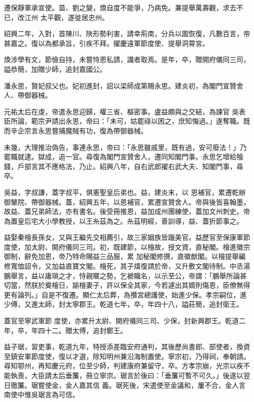 \begin{pinyinscope}
 遷保靜軍承宣使。苗、劉之變，煥自度不能爭，乃病免。兼提舉萬壽觀，求去不已，改江州
 太平觀，遂徙居忠州。



 紹興二年，入對，首陳川、陜形勢利害，請幸荊南，分兵以圖恢復，凡數百言，帝甚嘉之。復以為都承旨，引疾不拜。擢慶遠軍節度使、提舉洞霄宮。



 煥涉學有文，節儉自持，未嘗恃恩私請，識者取焉。是年，卒，贈開府儀同三司，謚恭簡，加贈少師，追封嘉國公。



 潘永思，賢妃叔父也。妃初進封，詔以梁師成第賜永思。建炎初，為閣門宣贊舍人、帶御器械。



 元祐太后在虔，帝遣永思迎歸，權三省、樞密事。盧益頗與之交結，為諫官
 吳表臣所論，範宗尹請出永思，帝曰：「未可，姑罷祿以困之，庶知悔過。」遂奪職。既而辛企宗言永思嘗捕魔賊有功，復為帶御器械。



 未幾，大理推治偽告，事連永思，帝曰：「永思雖戚里，既有過，安可廢法！」乃罷職就逮。獄成，追一官。尋復為閣門宣贊舍人，遷同知閣門事。永思乞增給飱錢，戶部言其不應格法，乃止。紹興八年，自右武郎擢右武大夫、知閣門事，尋卒。



 吳益，字叔謙，蓋字叔平，俱憲聖皇后弟也。益，建炎末，以
 恩補官，累遷乾辦御輦院、帶御器械。蓋，紹興五年，以恩補官，累遷宣贊舍人。帝與後皆喜翰墨，故益、蓋兄弟師法，亦有書名。後受冊推恩，益加成州團練使，蓋加文州刺史。帝為置皇后宅大小學教授，以王糸茲為之。糸茲明經，善訓導，益、蓋折節事之。



 益娶秦檜長孫女，又與王繼先交相薦引，故三家姻族皆躐美官。益歷官至保康軍節度使，加太尉、開府儀同三司。初，既建節，以檜故，授文資，直秘閣。檜進徽宗御制，辭免加恩，帝乃特命賜益三品服，累
 加秘閣修撰，直徽猷閣。以檜提舉編修寬恤詔令，又加益直寶文閣。檜死，其子熺復請於帝，又升敷文閣待制。中丞湯鵬舉言，益以庸瑣之才，恃親暱之勢，乞褫職名，以示至公，帝謂：「鵬舉所論甚切當，然朕於奠檜日，諭檜妻子，許以保全其家，今若遽出其婿則傷恩，臣僚無得更有論列。」自是不復遷。顯仁太后葬，為攢宮總護使，始進少保。孝宗嗣位，進少傅，又進太師，封太寧郡王。乾道七年，卒，年四十八，謚莊簡，追封衛王。



 蓋官至寧武軍節
 度使，亦累升太尉、開府儀同三司、少保，封新興郡王。乾道二年，卒，年四十二。贈太傅，追封鄭王。



 益子琚，習吏事，乾道九年，特授添差臨安府通判，其後歷尚書郎、部使者，換資至鎮安軍節度使，復以才選，除知明州兼沿海制置使。寧宗初，乃得祠，奉朝請。尋知鄂州，再知慶元府，位至少師，判建康府兼留守，卒。方孝宗崩，光宗以疾不能執喪，大臣請太后垂簾，冊立寧宗。琚言於後曰：「垂簾可暫不可久。」後遂以翌日徹簾。琚嘗使金，金人嘉其信
 義。琚死後，宋遣使至金議和，屢不合，金人言南使中惟吳琚言為可信。




\end{pinyinscope}
